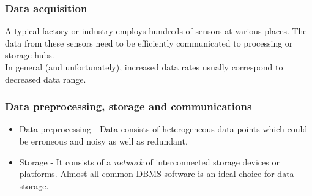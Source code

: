 \documentclass[9pt]{beamer}
\begin{document}
\begin{frame}
 \frametitle{Data acquisition}

 A typical factory or industry employs hundreds of sensors at various places. The data from these sensors need to be efficiently communicated to processing or storage hubs.\cite{Dai_2019} \\

 In general (and unfortunately), \alert{increased data rates usually correspond to decreased data range}.



\end{frame}

\begin{frame}
 \frametitle{Data preprocessing, storage and communications}

 \begin{itemize}
     \item<1-> Data preprocessing - Data consists of heterogeneous data points which could be erroneous and noisy as well as redundant.



     \item<3-> Storage - It consists of a \textit{network} of interconnected storage devices or platforms. Almost all common DBMS software is an ideal choice for data storage.


 \end{itemize}

\end{frame}
\end{document}
